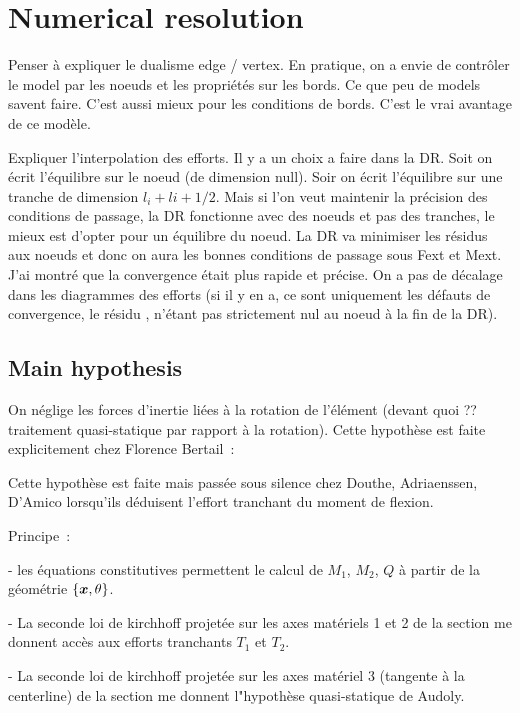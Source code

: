 \section{Numerical resolution}

Penser à expliquer le dualisme edge / vertex. En pratique, on a envie de contrôler le model par les noeuds et les propriétés sur les bords. Ce que peu de models savent faire. C'est aussi mieux pour les conditions de bords. C'est le vrai avantage de ce modèle.

Expliquer l'interpolation des efforts. Il y a un choix a faire dans la DR. Soit on écrit l'équilibre sur le noeud (de dimension null). Soir on écrit l'équilibre sur une tranche de dimension $l_i+l{i+1}/2$. Mais si l'on veut maintenir la précision des conditions de passage, la DR fonctionne avec des noeuds et pas des tranches, le mieux est d'opter pour un équilibre du noeud. La DR va minimiser les résidus aux noeuds et donc on aura les bonnes conditions de passage sous Fext et Mext. J'ai montré que la convergence était plus rapide et précise. On a pas de décalage dans les diagrammes des efforts (si il y en a, ce sont uniquement les défauts de convergence, le résidu , n'étant pas strictement nul au noeud à la fin de la DR).

\subsection{Main hypothesis}

On néglige les forces d'inertie liées à la rotation de l'élément  (devant quoi ?? traitement quasi-statique par rapport à la rotation). Cette hypothèse est faite explicitement chez Florence Bertail~:



Cette hypothèse est faite mais passée sous silence chez Douthe, Adriaenssen, D'Amico lorsqu'ils déduisent l'effort tranchant du moment de flexion.

Principe~:

- les équations constitutives permettent le calcul de $M_1$, $M_2$, $Q$ à partir de la géométrie $\{\boldsymbol{x},\theta\}$.

- La seconde loi de kirchhoff projetée sur les axes matériels 1 et 2 de la section me donnent accès aux efforts tranchants $T_1$ et $T_2$.

- La seconde loi de kirchhoff projetée sur les axes matériel 3 (tangente à la centerline) de la section me donnent l"hypothèse quasi-statique de Audoly.



